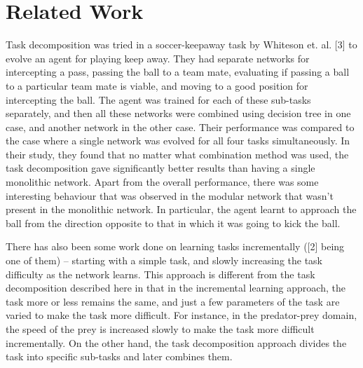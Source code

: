 \section{Related Work}
Task decomposition was tried in a soccer-keepaway task by Whiteson et. al. [3] to evolve an agent for playing keep away. They had separate networks for intercepting a pass, passing the ball to a team mate, evaluating if passing a ball to a particular team mate is viable, and moving to a good position for intercepting the ball. The agent was trained for each of these sub-tasks separately, and then all these networks were combined using decision tree in one case, and another network in the other case. Their performance was compared to the case where a single network was evolved for all four tasks simultaneously. In their study, they found that no matter what combination method was used, the task decomposition gave significantly better results than having a single monolithic network.  Apart from the overall performance, there was some interesting behaviour that was observed in the modular network that wasn’t present in the monolithic network. In particular, the agent learnt to approach the ball from the direction opposite to that in which it was going to kick the ball.

There has also been some work done on learning tasks incrementally ([2] being one of them) -- starting with a simple task, and slowly increasing the task difficulty as the network learns. This approach is different from the task decomposition described here in that in the incremental learning approach, the task more or less remains the same, and just a few parameters of the task are varied to make the task more difficult. For instance, in the predator-prey domain, the speed of the prey is increased slowly to make the task more difficult incrementally. On the other hand, the task decomposition approach divides the task into specific sub-tasks and later combines them.
